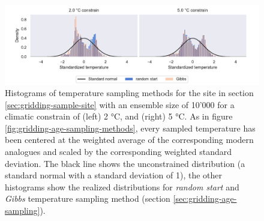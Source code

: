 \begin{refsection}
\begin{figure}[h]
	\includegraphics[width=\linewidth]{gridding-figures/temp-sampling-methods-realized.pdf}
	\caption[Scaled histograms of temperature sampling methods]{Histograms of temperature sampling methods for the site in section \ref{sec:gridding-sample-site} with an ensemble size of 10'000 for a climatic constrain of (left) 2 °C, and (right) 5 °C. As in figure \ref{fig:gridding-age-sampling-methods}, every sampled temperature has been centered at the weighted average of the corresponding modern analogues and scaled by the corresponding weighted standard deviation. The black line shows the unconstrained distribution (a standard normal with a standard deviation of 1), the other histograms show the realized distributions for \textit{random start} and \textit{Gibbs} temperature sampling method (section \ref{sec:gridding-age-sampling}).}
	\label{fig:gridding-temp-sampling-methods}
\end{figure}


\end{refsection}
